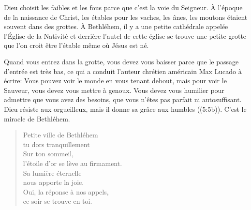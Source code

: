 Dieu choisit les faibles et les fous parce que c'est la voie du Seigneur. À l'époque de la naissance de Christ, les étables pour les vaches, les ânes, les moutons étaient souvent dans des grottes. À Bethléhem, il y a une petite cathédrale appelée l'Église de la Nativité et derrière l'autel de cette église se trouve une petite grotte que l'on croit être l'étable même où Jésus est né.

Quand vous entrez dans la grotte, vous devez vous baisser parce que le passage d'entrée est très bas, ce qui a conduit l'auteur chrétien américain Max Lucado à écrire: \og Vous pouvez voir le monde en vous tenant debout, mais pour voir le Sauveur, vous devez vous mettre à genoux. Vous devez vous humilier pour admettre que vous avez des besoins, que vous n'êtes pas parfait ni autosuffisant. \fg{} \og Dieu résiste aux orgueilleux, mais il donne sa grâce aux humbles \fg{} ((5:5b)). C'est le miracle de Bethléhem.


\ornrule

\begin{verse}
Petite ville de Bethléhem\\
tu dors tranquillement\\
Sur ton sommeil,\\
l'étoile d'or se lève au firmament.\\
Sa lumière éternelle\\
nous apporte la joie.\\
Oui, la réponse à nos appels,\\
ce soir se trouve en toi.
\end{verse}
